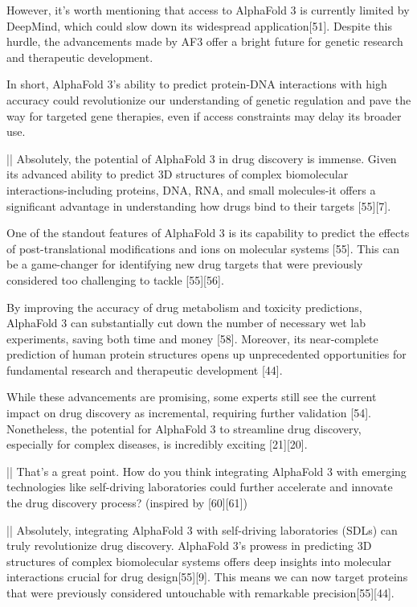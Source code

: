 \documentclass[11pt]{article}
\begin{document}
\begin{showcase}[title=Topic: AlphaFold 3]
However, it's worth mentioning that access to AlphaFold 3 is currently limited by DeepMind, which could slow down its widespread application[51]. Despite this hurdle, the advancements made by AF3 offer a bright future for genetic research and therapeutic development.

In short, AlphaFold 3's ability to predict protein-DNA interactions with high accuracy could revolutionize our understanding of genetic regulation and pave the way for targeted gene therapies, even if access constraints may delay its broader use.

||
Absolutely, the potential of AlphaFold 3 in drug discovery is immense. Given its advanced ability to predict 3D structures of complex biomolecular interactions-including proteins, DNA, RNA, and small molecules-it offers a significant advantage in understanding how drugs bind to their targets [55][7]. 

One of the standout features of AlphaFold 3 is its capability to predict the effects of post-translational modifications and ions on molecular systems [55]. This can be a game-changer for identifying new drug targets that were previously considered too challenging to tackle [55][56]. 

By improving the accuracy of drug metabolism and toxicity predictions, AlphaFold 3 can substantially cut down the number of necessary wet lab experiments, saving both time and money [58]. Moreover, its near-complete prediction of human protein structures opens up unprecedented opportunities for fundamental research and therapeutic development [44]. 

While these advancements are promising, some experts still see the current impact on drug discovery as incremental, requiring further validation [54]. Nonetheless, the potential for AlphaFold 3 to streamline drug discovery, especially for complex diseases, is incredibly exciting [21][20].

|\moderatorbg{\moderator:}|
That's a great point. How do you think integrating AlphaFold 3 with emerging technologies like self-driving laboratories could further accelerate and innovate the drug discovery process? (inspired by [60][61])

||
Absolutely, integrating AlphaFold 3 with self-driving laboratories (SDLs) can truly revolutionize drug discovery. AlphaFold 3's prowess in predicting 3D structures of complex biomolecular systems offers deep insights into molecular interactions crucial for drug design[55][9]. This means we can now target proteins that were previously considered untouchable with remarkable precision[55][44].


\end{showcase}
\end{document}
